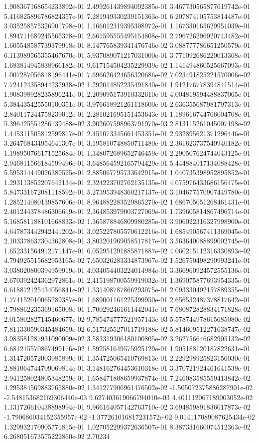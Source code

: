 1.908367168654233892e-01	2.499261439894092385e-01	3.467730565877619742e-01	5.416825896786824357e-01	7.281949330239151363e-01	6.207874105753814487e-01	3.035258575326901798e-01	1.166012319395308972e-01	1.167330165629951039e-01	1.894711689245565378e-01	2.661595555495154808e-01	2.796726296920743482e-01	1.605548587739379918e-01	8.147765839341476746e-02	3.088777786651250579e-01	6.113989565355467670e-01	5.937089071217031000e-01	3.771092686220013368e-01	1.683814945838966182e-01	9.617154504235229939e-02	1.141494860525667093e-01	1.007287056818196441e-01	7.696626424656320686e-02	7.023491825221570006e-02	7.724124358944232938e-02	1.292014852235491840e-01	1.912176778394841514e-01	1.908398928235896241e-01	2.209095173910332610e-01	4.004819594488837065e-01	5.384435425550100351e-01	3.976618921261118600e-01	2.636355687981797313e-01	2.840117244758239012e-01	2.281021695151453643e-01	1.189616744766004708e-01	5.396425551286139488e-02	3.902607598963791970e-03	2.813115261045007198e-02	1.445311505812599817e-01	2.451073345661453351e-01	2.932895621371296446e-01	3.264768434954641307e-01	3.195810748850711480e-01	2.361623737540940182e-01	1.198950766171525684e-01	1.348072689652746459e-01	2.290507624744043125e-01	2.946811566184599496e-01	3.648564592165794429e-01	5.444884017134088428e-01	5.595314449026389525e-01	2.885067795733642915e-01	1.040735398952895852e-01	1.293113852207642134e-01	2.324223702762135135e-01	4.075976433686156475e-01	5.847331672081118592e-01	5.273953948360217137e-01	3.104677570907449780e-01	1.285214080139857606e-01	8.964882283529865270e-02	1.686705051268461431e-01	2.401244378486306619e-01	2.364853979003727069e-01	1.739605814867496714e-01	5.168581188101668833e-02	1.365878846809980285e-01	3.906022316327998900e-01	4.647873442942441202e-01	3.025227805570612216e-01	1.685490567411369045e-01	2.103378637304362808e-01	3.803201969058517817e-01	3.563640088899002745e-01	1.652331564912171147e-01	6.052951291885871887e-02	4.060215112316330893e-02	4.794925515682953165e-02	7.650326283334873967e-02	1.526750498290993241e-01	3.038020800394959919e-01	4.034054403224014984e-01	3.366960924572555136e-01	2.670392424362972861e-01	2.415198700559919032e-01	1.369075877693954335e-01	6.618872125434056841e-02	1.331408787866293075e-01	2.093330492157889355e-01	1.774152010065289387e-01	1.689001161225399950e-01	2.656532487378817642e-01	2.798862235369165008e-01	1.700292461611442041e-01	7.680872828834171828e-02	2.015802827145460677e-02	9.785474777521957143e-03	5.578744978615685080e-02	7.811330590345484659e-02	6.517325527011719188e-02	5.814609512271638747e-02	3.983581287931090009e-02	3.583319306180100805e-02	3.262756646682905132e-02	6.681215570867499176e-02	1.592581649575925129e-01	1.905188120187822631e-01	1.314720572003985899e-01	1.354725065410769813e-01	2.229298925823156030e-01	2.881064744709069814e-01	3.148162764453610318e-01	3.370721924461641539e-01	2.941258024805348259e-01	1.658471808659937874e-01	7.246083585559413842e-02	4.295384569883765880e-02	1.341277906961476502e-02	-1.505072375886287901e-02	-7.548153682169306440e-03	9.627403619066794010e-03	4.401112067189003052e-02	1.131726610438898994e-01	9.966164057142763710e-02	3.694859891836017873e-02	-1.790686034152355957e-02	-1.377261016817231572e-02	9.014117089087625434e-02	1.329932170905771815e-01	1.027052299372636507e-01	8.387331660074512363e-02	6.268051673575222860e-02	2.70234